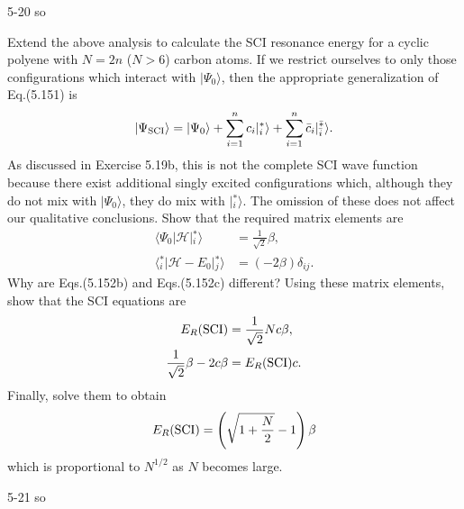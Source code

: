 \documentclass[a4paper]{book}
\begin{document}
	\begin{solution}
		5-20 so
	\end{solution}
	
	\begin{exercise}
	Extend the above analysis to calculate the SCI resonance energy for a cyclic polyene with $N=2n$ ($N>6$) carbon atoms. If we restrict ourselves to only those configurations which interact with $| \Psi_0 \rangle$, then the appropriate generalization of Eq.(5.151) is
	\[
		| \Psi_{\rm SCI} \rangle = | \Psi_0 \rangle + \sum_{i=1}^n c_i | {}^*_i \rangle + \sum_{i=1}^n \bar{c}_i | {}^{\bar{*}}_{\bar{i}}\rangle.
	\]
	As discussed in Exercise 5.19b, this is not the complete SCI wave function because there exist additional singly excited configurations which, although they do not mix with $|\Psi_0\rangle$, they do mix with $| {}^*_i \rangle$. The omission of these does not affect our qualitative conclusions. Show that the required matrix elements are
	\begin{align*}
		\langle \Psi_0 | \mathscr{H} | {}^*_i \rangle &= \frac{1}{\sqrt{2}} \beta, \\
		\langle {}^*_i | \mathscr{H} - E_0 | {}^*_j \rangle &= (-2\beta) \delta_{ij}.
	\end{align*}
	Why are Eqs.(5.152b) and Eqs.(5.152c) different? Using these matrix elements, show that the SCI equations are
	\begin{align*}
		E_R ({\rm SCI}) &= \frac{1}{\sqrt{2}} Nc \beta , \\
		\frac{1}{\sqrt{2}} \beta - 2c \beta &= E_R( {\rm SCI} )c.
	\end{align*}
	Finally, solve them to obtain
	\[
		E_R ({\rm SCI}) = \left( \sqrt{ 1 + \frac{N}{2} } - 1 \right) \beta
	\]
	which is proportional to $N^{1/2}$ as $N$ becomes large.
	\end{exercise}
	
	\begin{solution}
		5-21 so
	\end{solution}
	
\end{document}
